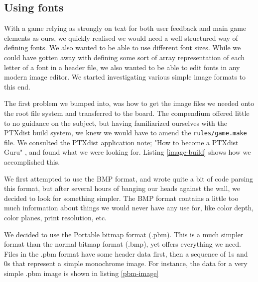 \subsection{Using fonts}

With a game relying as strongly on text for both user feedback and main game elements as ours, we quickly realised we would need a well structured way of defining fonts. We also wanted to be able to use different font sizes. 
While we could have gotten away with defining some sort of array representation of each letter of a font in a header file, we also wanted to be able to edit fonts in any modern image editor. We started investigating various simple image formats to this end.

The first problem we bumped into, was how to get the image files we needed onto the root file system and transferred to the board. The compendium offered little to no guidance on the subject, but having familiarized ourselves with the PTXdist build system, we knew we would have to amend the \texttt{rules/game.make} file. We consulted the PTXdist application note; "How to become a PTXdist Guru" \cite{ptxdistguru}, and found what we were looking for. Listing \ref{image-build} shows how we accomplished this.



We first attempted to use the BMP format, and wrote quite a bit of code parsing this format, but after several hours of banging our heads against the wall, we decided to look for something simpler. 
The BMP format contains a little too much information about things we would never have any use for, like color depth, color planes, print resolution, etc.

We decided to use the Portable bitmap format (.pbm).
This is a much simpler format than the normal bitmap format (.bmp),
yet offers everything we need.
Files in the .pbm format have some header data first, then a sequence of 1s and 0s that represent a simple monochrome image.
For instance, the data for a very simple .pbm image is shown in listing \ref{pbm-image}


